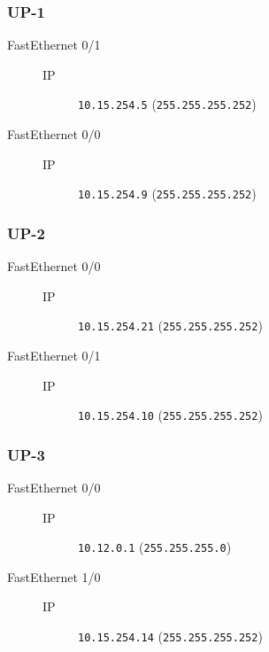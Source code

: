 \subsubsection{UP-1}

	\begin{description}
		\item[FastEthernet 0/1] 
		\begin{description}
			\item[IP] \texttt{10.15.254.5} (\texttt{255.255.255.252})
		\end{description}

		\item[FastEthernet 0/0] 
		\begin{description}
			\item[IP] \texttt{10.15.254.9} (\texttt{255.255.255.252})
		\end{description}

	\end{description}
	
	\clearpage
\subsubsection{UP-2}

	\begin{description}
		\item[FastEthernet 0/0] 
		\begin{description}
			\item[IP] \texttt{10.15.254.21} (\texttt{255.255.255.252})
		\end{description}

		\item[FastEthernet 0/1] 
		\begin{description}
			\item[IP] \texttt{10.15.254.10} (\texttt{255.255.255.252})
		\end{description}

	\end{description}
	
	\clearpage
\subsubsection{UP-3}

	\begin{description}
		\item[FastEthernet 0/0] 
		\begin{description}
			\item[IP] \texttt{10.12.0.1} (\texttt{255.255.255.0})
		\end{description}

		\item[FastEthernet 1/0] 
		\begin{description}
			\item[IP] \texttt{10.15.254.14} (\texttt{255.255.255.252})
		\end{description}

	\end{description}
	
	\clearpage
